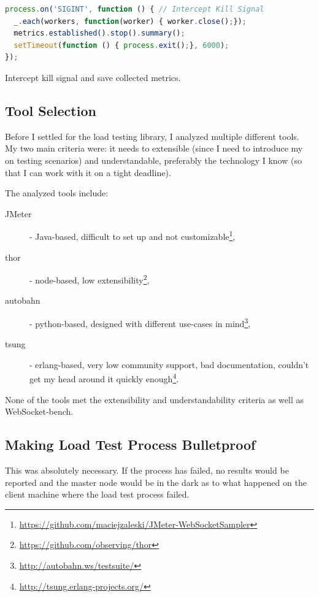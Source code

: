 \documentclass{uvamscse}
\begin{document}
\begin{sourcecode}[H]
\begin{lstlisting}[language=javascript]
process.on('SIGINT', function () { // Intercept Kill Signal
  _.each(workers, function(worker) { worker.close();});
  metrics.established().stop().summary();
  setTimeout(function () { process.exit();}, 6000);
});

\end{lstlisting}
\caption{Intercept kill signal and save collected metrics.}
\label{lstlisting:loadtestexec4}
\end{sourcecode}


\subsection{Tool Selection}

Before I settled for the load testing library, I analyzed multiple different tools. My two main criteria were: it needs to extensible (since I need to introduce my on testing scenarios) and understandable, preferably the technology I know (so that I can work with it on a tight deadline).

The analyzed tools include:
\begin{description}
  \item [JMeter]- Java-based, difficult to set up and not customizable\footnote{\url{https://github.com/maciejzaleski/JMeter-WebSocketSampler}},
  \item [thor]- node-based, low extensibility\footnote{\url{https://github.com/observing/thor}},
  \item [autobahn]- python-based, designed with different use-cases in mind\footnote{\url{http://autobahn.ws/testsuite/}},
  \item [tsung]- erlang-based, very low community support, bad documentation, couldn't get my head around it quickly enough\footnote{\url{http://tsung.erlang-projects.org/}}.
\end{description}

None of the tools met the extensibility and understandability criteria as well as WebSocket-bench.

\subsection{Making Load Test Process Bulletproof}
This was absolutely necessary. If the process has failed, no results would be reported and the master node would be in the dark as to what happened on the client machine where the load test process failed.
\end{document}
